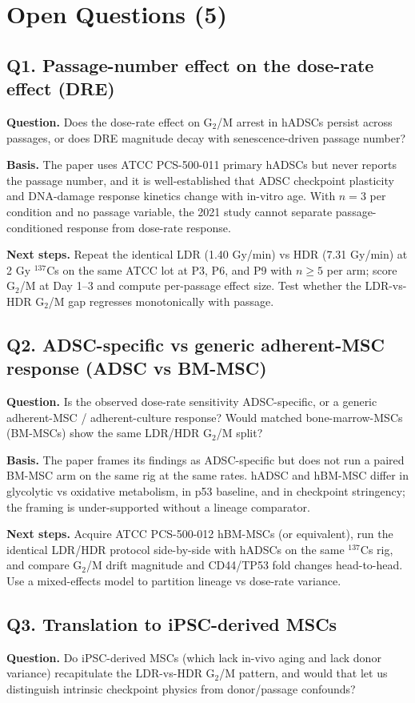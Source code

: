 \section{Open Questions (5)}

\subsection*{Q1. Passage-number effect on the dose-rate effect (DRE)}
\textbf{Question.} Does the dose-rate effect on G$_2$/M arrest in hADSCs persist across passages,
or does DRE magnitude decay with senescence-driven passage number?

\textbf{Basis.} The paper uses ATCC PCS-500-011 primary hADSCs but never reports the passage number,
and it is well-established that ADSC checkpoint plasticity and DNA-damage response kinetics change
with in-vitro age. With $n{=}3$ per condition and no passage variable, the 2021 study cannot separate
passage-conditioned response from dose-rate response.

\textbf{Next steps.} Repeat the identical LDR (1.40 Gy/min) vs HDR (7.31 Gy/min) at 2 Gy $^{137}$Cs
on the same ATCC lot at P3, P6, and P9 with $n{\ge}5$ per arm; score G$_2$/M at Day 1--3 and compute
per-passage effect size. Test whether the LDR-vs-HDR G$_2$/M gap regresses monotonically with passage.

\subsection*{Q2. ADSC-specific vs generic adherent-MSC response (ADSC vs BM-MSC)}
\textbf{Question.} Is the observed dose-rate sensitivity ADSC-specific, or a generic adherent-MSC /
adherent-culture response? Would matched bone-marrow-MSCs (BM-MSCs) show the same LDR/HDR G$_2$/M split?

\textbf{Basis.} The paper frames its findings as ADSC-specific but does not run a paired BM-MSC arm
on the same rig at the same rates. hADSC and hBM-MSC differ in glycolytic vs oxidative metabolism,
in p53 baseline, and in checkpoint stringency; the framing is under-supported without a lineage
comparator.

\textbf{Next steps.} Acquire ATCC PCS-500-012 hBM-MSCs (or equivalent), run the identical LDR/HDR
protocol side-by-side with hADSCs on the same $^{137}$Cs rig, and compare G$_2$/M drift magnitude
and CD44/TP53 fold changes head-to-head. Use a mixed-effects model to partition lineage vs dose-rate
variance.

\subsection*{Q3. Translation to iPSC-derived MSCs}
\textbf{Question.} Do iPSC-derived MSCs (which lack in-vivo aging and lack donor variance) recapitulate
the LDR-vs-HDR G$_2$/M pattern, and would that let us distinguish intrinsic checkpoint physics from
donor/passage confounds?

